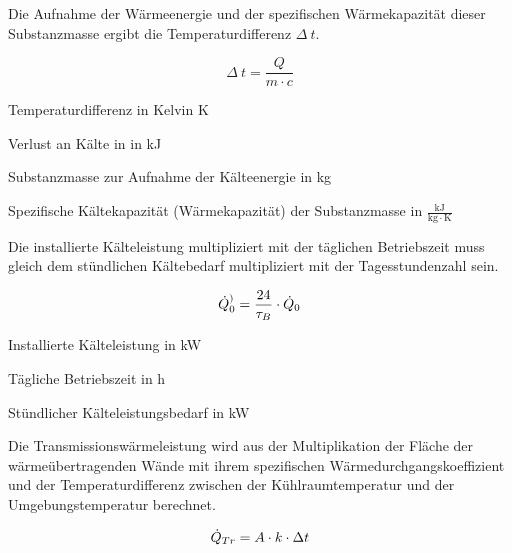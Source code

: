 Die Aufnahme der Wärmeenergie und der spezifischen Wärmekapazität dieser
Substanzmasse ergibt die Temperaturdifferenz $\Delta\:t$.

\begin{equation}
	\Delta\:t = \frac{Q}{m\cdot c}
\label{tdif}
\end{equation}

\begin{description}[\dth]

	\item[$\Delta\:t$] Temperaturdifferenz in Kelvin K
	\item[$Q$] Verlust an K\"alte in in kJ
	\item[$m$] Substanzmasse zur Aufnahme der K\"alteenergie in kg
	\item[$c$] Spezifische K\"altekapazit\"at (W\"armekapazit\"at) der
	Substanzmasse in $\mathrm{\frac{kJ}{kg \cdot K}}$

\end{description}
\vspace{0.5cm}

Die installierte Kälteleistung multipliziert mit der täglichen Betriebszeit muss
gleich dem stündlichen K\"altebedarf multipliziert mit der Tagesstundenzahl
sein.

\begin{equation}
	\pinstall = \frac{24}{ \tau_{B} }  \cdot \pkalt \label{pinstall}
\end{equation}

\begin{description}[\dth]

	\item[$\pinstall$] Installierte Kälteleistung in kW
	\item[$\tau_{B}$] Tägliche Betriebszeit in h
	\item[$\pkalt$] St\"undlicher Kälteleistungsbedarf in
	kW

\end{description}
\vspace{0.5cm}

Die Transmissionswärmeleistung wird aus der Multiplikation der Fläche
der wärmeübertragenden Wände mit ihrem spezifischen Wärmedurchgangskoeffizient
und der Temperaturdifferenz zwischen der Kühlraumtemperatur und der
Umgebungstemperatur berechnet.

\begin{equation}
	\ptrans = A \cdot k \cdot \Delta t
	\label{ptrans}
\end{equation}

